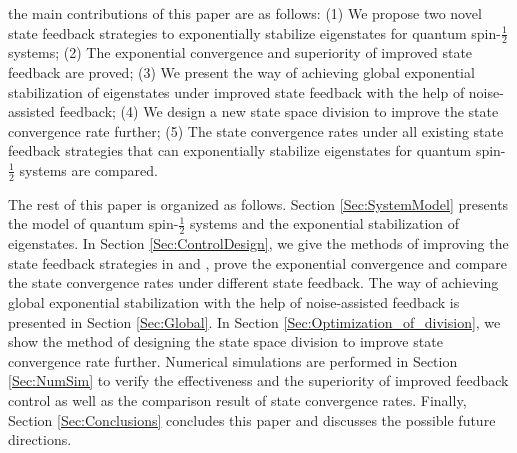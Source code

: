 \documentclass[]{elsarticle}
\begin{document}
{} the main contributions of this paper are as follows: (1) We propose two novel state feedback strategies to exponentially stabilize eigenstates for quantum spin-$\frac{1}{2}$ systems; (2) The exponential convergence and superiority of improved state feedback are proved; (3) We present the way of achieving global exponential stabilization of eigenstates under improved state feedback with the help of noise-assisted feedback; (4) We design a new state space division to improve the state convergence rate further; (5) The state convergence rates under all existing state feedback strategies that can exponentially stabilize eigenstates for quantum spin-$\frac{1}{2}$ systems are compared.

The rest of this paper is organized as follows. Section \ref{Sec:SystemModel} presents the model of quantum spin-$\frac{1}{2}$ systems and the exponential stabilization of eigenstates. In Section \ref{Sec:ControlDesign}, we give the methods of improving the state feedback strategies in \cite{LAMC2018} and \cite{WSJZJ2021b}, prove the exponential convergence and compare the state convergence rates under different state feedback. The way of achieving global exponential stabilization with the help of noise-assisted feedback is presented in Section \ref{Sec:Global}. In Section \ref{Sec:Optimization_of_division}, we show the method of designing the state space division to improve state convergence rate further. Numerical simulations are performed in Section \ref{Sec:NumSim} to verify the effectiveness and the superiority of improved feedback control as well as the comparison result of state convergence rates. Finally, Section \ref{Sec:Conclusions} concludes this paper and discusses the possible future directions.
\end{document}
